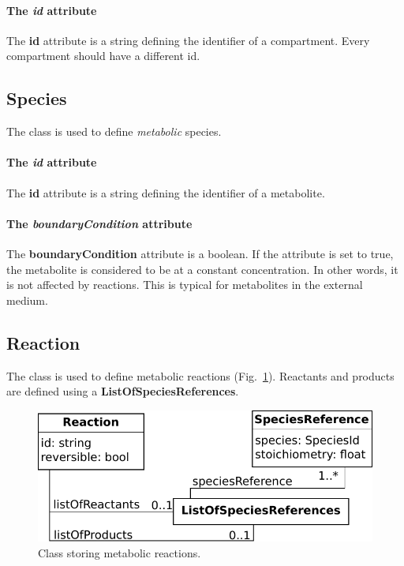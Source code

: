 \paragraph{The \textit{id} attribute}
The \textbf{id} attribute is a string defining the identifier of a compartment.
Every compartment should have a different id.


\subsection{Species}
\label{sec:species}

The \species{} class is used to define \emph{metabolic} species.

\paragraph{The \textit{id} attribute}
The \textbf{id} attribute is a string defining the identifier of a metabolite.

\paragraph{The \textit{boundaryCondition} attribute}
The \textbf{boundaryCondition} attribute is a boolean.
If the attribute is set to true, the metabolite is considered to be at
a constant concentration.
In other words, it is not affected by reactions.
This is typical for metabolites in the external medium.


\subsection{Reaction}
\label{sec:reaction}

The \reaction{} class is used to define metabolic reactions
(Fig.~\ref{fig:metabolism_reaction}).
Reactants and products are defined using a \textbf{ListOfSpeciesReferences}.

\begin{figure}
  \centering
  \includegraphics[scale=0.8]{figures/metabolism_reaction}
  \caption{Class storing metabolic reactions.}
\label{fig:metabolism_reaction}
\end{figure}

